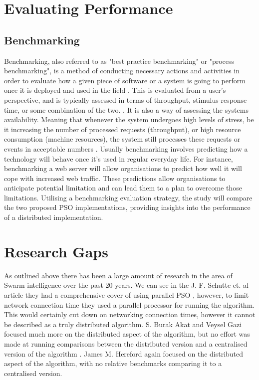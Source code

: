 \documentclass[oneside,12pt]{book}
\begin{document}
\section{Evaluating Performance}
\subsection{Benchmarking}
Benchmarking, also referred to as "best practice benchmarking" or "process benchmarking", is a method of conducting necessary actions and activities in order to evaluate how a given piece of software or a system is going to perform once it is deployed and used in the field \cite{jetmarova2011comparison}. This is evaluated from a user’s perspective, and is typically assessed in terms of throughput, stimulus-response time, or some combination of the two. \cite{vokolos1998performance}. It is also a way of assessing the systems availability. Meaning that whenever the system undergoes high levels of stress, be it increasing the number of processed requests (throughput), or high resource consumption (machine resources), the system still processes these requests or events in acceptable numbers \cite{vokolos1998performance}. Usually benchmarking involves predicting how a technology will behave once it's used in regular everyday life. For instance, benchmarking a web server will allow organisations to predict how well it will cope with increased web traffic. These predictions allow organisations to anticipate potential limitation and can lead them to a plan to overcome those limitations. Utilising a benchmarking evaluation strategy, the study will compare the two proposed PSO implementations, providing insights into the performance of a distributed implementation. 
 
\section{Research Gaps}
As outlined above there has been a large amount of research in the area of Swarm intelligence over the past 20 years. We can see in the J. F. Schutte et. al article they had a comprehensive cover of using parallel PSO \cite{schutte2004parallel}, however, to limit network connection time they used a parallel processor for running the algorithm. This would certainly cut down on networking connection times, however it cannot be described as a truly distributed algorithm. S. Burak Akat and Veysel Gazi focused much more on the distributed aspect of the algorithm, but no effort was made at running comparisons between the distributed version and a centralised version of the algorithm \cite{akat_gazi_2008}. James M. Hereford again focused on the distributed aspect of the algorithm, with no relative benchmarks comparing it to a centralised version. \cite{hereford_2006}
\end{document}
